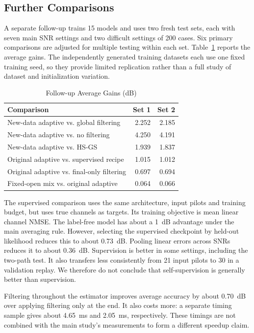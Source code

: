 \documentclass[journal]{IEEEtran}
\begin{document}
\subsection{Further Comparisons}
A separate follow-up trains 15 models and uses two fresh test sets, each
with seven main SNR settings and two difficult settings of 200 cases.
Six primary comparisons are adjusted for multiple testing within each
set. Table~\ref{tab:checks} reports the average gains. The independently
generated training datasets each use one fixed training seed, so they
provide limited replication rather than a full study of dataset and
initialization variation.

\begin{table}[!t]
\caption{Follow-up Average Gains (dB)}
\label{tab:checks}
\centering\small
\begin{tabular}{@{}p{}rr@{}}
\toprule
Comparison & Set 1 & Set 2\\\midrule
New-data adaptive vs. global filtering & 2.252 & 2.185\\
New-data adaptive vs. no filtering & 4.250 & 4.191\\
New-data adaptive vs. HS-GS & 1.939 & 1.837\\
Original adaptive vs. supervised recipe & 1.015 & 1.012\\
Original adaptive vs. final-only filtering & 0.697 & 0.694\\
Fixed-open mix vs. original adaptive & 0.064 & 0.066\\
\bottomrule
\end{tabular}
\end{table}

The supervised comparison uses the same architecture, input pilots and
training budget, but uses true channels as targets. Its training objective
is mean linear channel NMSE. The label-free model has about a 1~dB
advantage under the main averaging rule. However, selecting the supervised
checkpoint by held-out likelihood reduces this to about 0.73~dB. Pooling
linear errors across SNRs reduces it to about 0.36~dB. Supervision is
better in some settings, including the two-path test. It also transfers
less consistently from 21 input pilots to 30 in a validation replay.
We therefore do not conclude that self-supervision is generally better
than supervision.

Filtering throughout the estimator improves average accuracy by about
0.70~dB over applying filtering only at the end. It also costs more: a
separate timing sample gives about 4.65~ms and 2.05~ms, respectively.
These timings are not combined with the main study's measurements to
form a different speedup claim.
\end{document}
